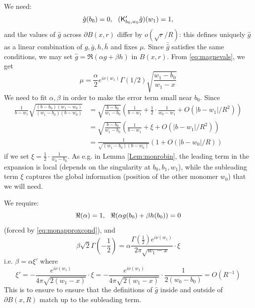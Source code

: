 \documentclass[10pt]{article}
\newcommand{\rK}{{\sf K}}
\begin{document}
We need: 
\begin{equation}\label{eq:monapproxcond}
\hat g(b_0)=0,{\rm\ \ }(\rK'_{b_0,w_0}\hat g)(w_1)=1,
\end{equation}
and the values of $\hat g$ across $\partial B(x,r)$ differ by $o(\sqrt r/R)$: this defines uniquely $\hat g$ as a linear combination of $g,\bar g,h,\bar h$ and fixes $\mu$. Since $\bar{\hat g}$ satisfies the same conditions, we may set $\hat g=\Re(\alpha g+\beta h)$ in $B(x,r)$. From \eqref{eq:magnevals}, we get 
$$\mu=\frac\alpha 2 e^{i\nu(w_1)}\Gamma(1/2)\sqrt{\frac{w_1-b_0}{w_1-x}}$$
We need to fit $\alpha,\beta$ in order to make the error term small near $b_0$. Since
\begin{equation}\label{eq:monapproxcond1}
\begin{split}
\frac{1}{b-w_1}\sqrt{\frac{(b-b_0)(w_1-w_0)}{(w_1-b_0)(b-w_0)}}
&=\sqrt{\frac{b-b_0}{w_1-b_0}}\left(\frac{1}{b-w_1}+\frac 12\cdot\frac
{1}{w_0-w_1}+O(|b-w_1|/R^2)
\right)\\
&=\sqrt{\frac{b-b_0}{w_1-b_0}}\left(\frac{1}{b-w_1}+\xi+O(|b-w_1|/R^2)
\right)\\
&=\frac{1}{\sqrt{(w_1-b_0)(b-w_0)}}\left(1+O(|b-w_0|/R)\right)
\end{split}\end{equation}
if we set
$\xi=\frac 12\cdot\frac
{1}{w_0-b_0}$. As e.g. in Lemma \ref{Lem:monrobin}, the leading term in the expansion is local (depends on the singularity at $b_0,b_1,w_1$), while the subleading term $\xi$ captures the global information (position of the other monomer $w_0$) that we will need.

We require: 
\begin{equation}\label{eq:monapproxcond2}
\Re(\alpha)=1,{\rm\ \ }\Re(\alpha g(b_0)+\beta h(b_0))=0
\end{equation}
(forced by \eqref{eq:monapproxcond}), and
$$\beta\sqrt 2\Gamma(-\frac 12)=\alpha\frac{\Gamma(\frac 12)e^{i\nu(w_1)}}{2\pi\sqrt{w_1-x}}\cdot\xi$$
i.e. $\beta=\alpha\xi'$ where
\begin{equation}\label{eq:xiprime}
\xi'=-\frac{e^{i\nu(w_1)}}{4\pi\sqrt{2(w_1-x)}}\cdot\xi=-\frac{e^{i\nu(w_1)}}{4\pi\sqrt{2(w_1-x)}}\cdot\frac{1}{2(w_0-b_0)}=O(R^{-1})
\end{equation}
This is to ensure to ensure that the definitions of $\hat g$ inside and outside of $\partial B(x,R)$ match up to the subleading term.
\end{document}

